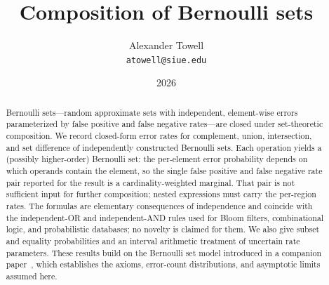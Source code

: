 \documentclass[11pt,final,hidelinks]{article}
\title
{
    Composition of Bernoulli sets
}
\author
{
    Alexander Towell\\
    \texttt{atowell@siue.edu}
}
\date{2026}
\numberwithin{equation}{section}
\begin{document}
\maketitle
\begin{abstract}
Bernoulli sets---random approximate sets with independent, element-wise errors parameterized by false positive and false negative rates---are closed under set-theoretic composition.
We record closed-form error rates for complement, union, intersection, and set difference of independently constructed Bernoulli sets.
Each operation yields a (possibly higher-order) Bernoulli set: the per-element error probability depends on which operands contain the element, so the single false positive and false negative rate pair reported for the result is a cardinality-weighted marginal.
That pair is not sufficient input for further composition; nested expressions must carry the per-region rates.
The formulas are elementary consequences of independence and coincide with the independent-OR and independent-AND rules used for Bloom filters, combinational logic, and probabilistic databases; no novelty is claimed for them.
We also give subset and equality probabilities and an interval arithmetic treatment of uncertain rate parameters.
These results build on the Bernoulli set model introduced in a companion paper~\cite{bernoulliSets}, which establishes the axioms, error-count distributions, and asymptotic limits assumed here.
\end{abstract}



\tableofcontents
{}










\end{document}
